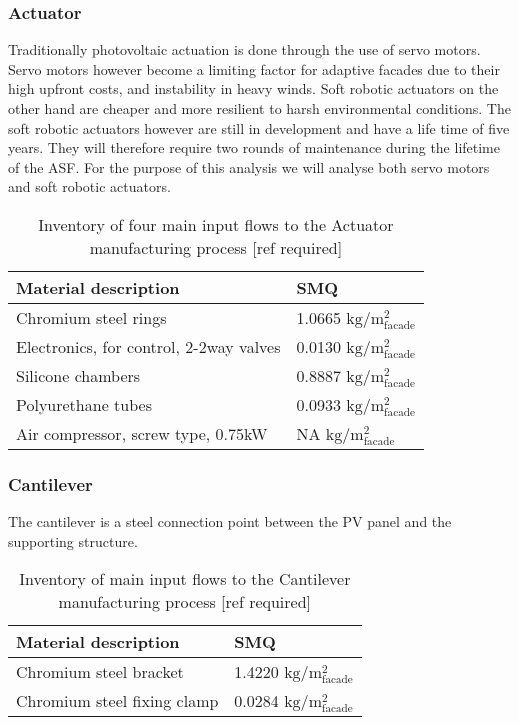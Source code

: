 \subsubsection*{Actuator}
Traditionally photovoltaic actuation is done through the use of servo motors. Servo motors however become a limiting factor for adaptive facades due to their high upfront costs, and instability in heavy winds. Soft robotic actuators on the other hand are cheaper and more resilient to harsh environmental conditions\cite{Svetozarevic2014a}. The soft robotic actuators however are still in development and have a life time of five years. They will therefore require two rounds of maintenance during the lifetime of the ASF.
For the purpose of this analysis we will analyse both servo motors and soft robotic actuators. 

\begin{table}[H]
\centering
\begin{tabular}{ll}
\hline
Material description & SMQ \\ \hline
Chromium steel rings	 & 1.0665 ${\mathrm{kg/m^2_{facade}}}$ \\
Electronics, for control, 2-2way valves  & 0.0130  ${\mathrm{kg/m^2_{facade}}}$\\
Silicone chambers & 0.8887 ${\mathrm{kg/m^2_{facade}}}$\\
Polyurethane tubes &0.0933 ${\mathrm{kg/m^2_{facade}}}$\\
Air compressor, screw type, 0.75kW & NA ${\mathrm{kg/m^2_{facade}}}$\\
\hline
\end{tabular}
\caption{Inventory of four main input flows to the Actuator manufacturing process [ref required]}
\label{tab:ActuatorInv}
\end{table}

\subsubsection*{Cantilever}
The cantilever is a steel connection point between the PV panel and the supporting structure.\\

\begin{table}[H]
\centering
\begin{tabular}{ll}
\hline
Material description & SMQ \\ \hline
Chromium steel bracket	 & 1.4220 ${\mathrm{kg/m^2_{facade}}}$ \\
Chromium steel fixing clamp  & 0.0284 ${\mathrm{kg/m^2_{facade}}}$\\
\hline
\end{tabular}
\caption{Inventory of main input flows to the Cantilever manufacturing process [ref required]}
\label{tab:CantileverInv}
\end{table}

